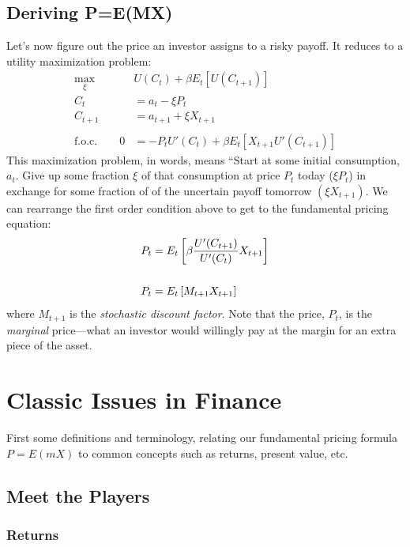 \documentclass[a4paper,12pt]{scrartcl}
\begin{document}
\newpage
\subsection{Deriving P=E(MX)}

Let's now figure out the price an investor assigns to a risky
payoff.  It reduces to a utility maximization problem:
\begin{align*}
    \max_{\xi} \quad &U(C_t) + \beta E_t\left[U(C_{t+1})\right] \\
    C_t &= a_t - \xi P_t  \\
    C_{t+1} &= a_{t+1} + \xi X_{t+1} \\\\
    \text{f.o.c.} \qquad 
    0 &= -P_t U'(C_t) + \beta E_t\left[ X_{t+1} U'(C_{t+1})\right] 
\end{align*}
This maximization problem, in words, means ``Start
at some initial consumption, $a_t$. Give up some 
fraction $\xi$ of that consumption at price $P_t$ today 
($\xi P_t$) in exchange for some fraction of of the
uncertain payoff tomorrow $(\xi X_{t+1})$. We can 
rearrange the first order condition above to get to the
fundamental pricing equation:
\begin{align}
    P_t &= E_t\left[ 
	\beta\frac{U'(C_{t+1})}{U'(C_{t})} X_{t+1} \right]
	\label{fullpemx} \\\notag\\
    P_t &= E_t\left[ M_{t+1} X_{t+1} \right] \notag
\end{align}
where $M_{t+1}$ is the \emph{stochastic discount factor}.
Note that the price, $P_t$, is the \emph{marginal} price---what
an investor would willingly pay at the margin for
an extra piece of the asset.


\newpage
\section{Classic Issues in Finance}

First some definitions and terminology, relating our fundamental
pricing formula $P = E(mX)$ to common concepts such as 
returns, present value, etc.

\subsection{Meet the Players}

\subsubsection{Returns}
\end{document}
